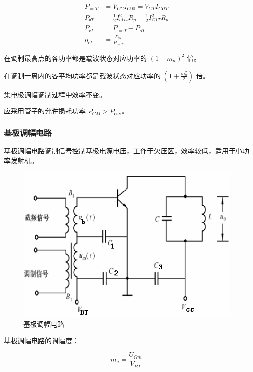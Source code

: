 \begin{equation}
\begin{aligned}
    P_{=T} &= V_{CC} I_{C00} = V_{CT} I_{COT} \\
    P_{oT} &= \frac{1}{2} I_{c1m}^2 R_p = \frac{1}{2} I_{C1T}^2 R_p \\
    P_{cT} &= P_{=T} - P_{oT} \\
    \eta_{cT} &= \frac{P_{oT}}{P_{=T}}
\end{aligned}
\end{equation}

在调制最高点的各功率都是载波状态对应功率的 $\left(1 + m_a\right)^2$ 倍。

在调制一周内的各平均功率都是载波状态对应功率的 $\left(1 + \frac{m_a^2}{2}\right)$ 倍。

集电极调幅调制过程中效率不变。

应采用管子的允许损耗功率 $P_{CM} > P_{\text{cav}}$。

\subsubsection{基极调幅电路}

基极调幅电路调制信号控制基极电源电压，工作于欠压区，效率较低，适用于小功率发射机。

\begin{figure}[htbp]
    \centering
    \includegraphics[scale=0.5]{image/Picture16.png}
    \caption{基极调幅电路}
\end{figure}

基极调幅电路的调幅度：

\begin{equation}
    m_a = \frac{U_{\Omega m}}{V_{BT}}
\end{equation}

